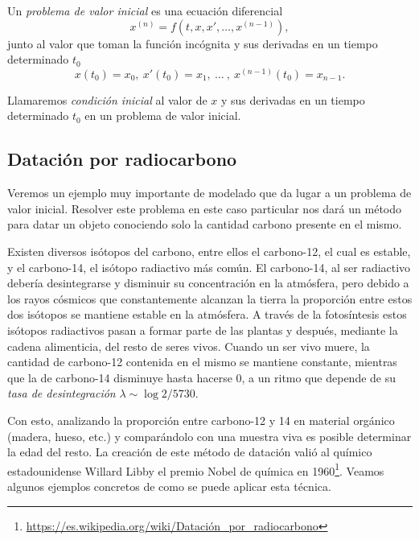\documentclass[../ecuaciones_diferenciales.tex]{subfiles}
\begin{document}
\begin{definition}
	Un \emph{problema de valor inicial} es una ecuación diferencial
	\[x^{(n)} = f(t, x, x', \dots, x^{(n - 1)}),\]
    junto al valor que toman la función incógnita y sus derivadas en un tiempo
    determinado \(t_0\)
	\[x(t_0) = x_0,\ x'(t_0) = x_1,\ \dots\ ,\ x^{(n - 1)}(t_0) = x_{n - 1}.\]
\end{definition}

\begin{definition}
    Llamaremos \emph{condición inicial} al valor de \(x\) y sus derivadas en un
    tiempo determinado \(t_0\) en un problema de valor inicial.
\end{definition}

\subsection{Datación por radiocarbono}

Veremos un ejemplo muy importante de modelado que da lugar a un problema de 
valor inicial. Resolver este problema en este caso particular nos dará un método
para datar un objeto conociendo solo la cantidad carbono presente en el mismo.

Existen diversos isótopos del carbono, entre ellos el carbono-12, el cual es
estable, y el carbono-14, el isótopo radiactivo más común. El carbono-14, al ser
radiactivo debería desintegrarse y disminuir su concentración en la atmósfera,
pero debido a los rayos cósmicos que constantemente alcanzan la tierra la
proporción entre estos dos isótopos se mantiene estable en la atmósfera. A
través de la fotosíntesis estos isótopos radiactivos pasan a formar parte de las
plantas y después, mediante la cadena alimenticia, del resto de seres vivos.
Cuando un ser vivo muere, la cantidad de carbono-12 contenida en el mismo se
mantiene constante, mientras que la de carbono-14 disminuye hasta hacerse 0,
a un ritmo que depende de su \emph{tasa de desintegración}
\(\lambda \sim \log 2 / 5730\).

Con esto, analizando la proporción entre carbono-12 y 14 en
material orgánico (madera, hueso, etc.) y comparándolo con una muestra viva es 
posible determinar la edad del resto. La creación de este método de
datación valió al químico estadounidense Willard Libby el premio Nobel de
química en
1960\footnote{\url{https://es.wikipedia.org/wiki/Datación_por_radiocarbono}}.
Veamos algunos ejemplos concretos de como se puede aplicar esta
técnica.
\end{document}

